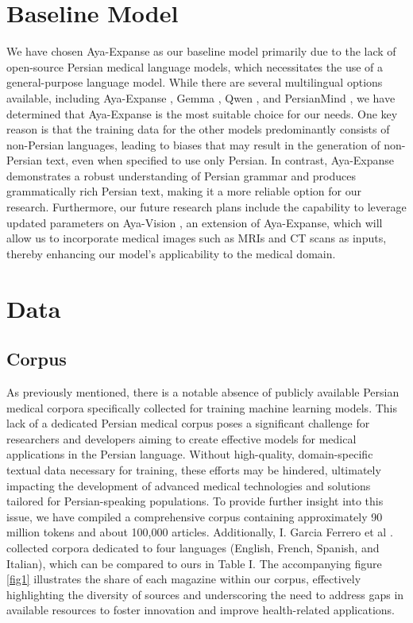 \documentclass[conference]{IEEEtran}
\begin{document}
\section{Baseline Model}
We have chosen Aya-Expanse as our baseline model primarily due to the lack of open-source Persian medical language models, which necessitates the use of a general-purpose language model. While there are several multilingual options available, including Aya-Expanse \cite{b5}, Gemma \cite{b11}, Qwen \cite{b12}, and PersianMind \cite{b12}, we have determined that Aya-Expanse is the most suitable choice for our needs. One key reason is that the training data for the other models predominantly consists of non-Persian languages, leading to biases that may result in the generation of non-Persian text, even when specified to use only Persian. In contrast, Aya-Expanse demonstrates a robust understanding of Persian grammar and produces grammatically rich Persian text, making it a more reliable option for our research. Furthermore, our future research plans include the capability to leverage updated parameters on Aya-Vision
\cite{b12}
, an extension of Aya-Expanse, which will allow us to incorporate medical images such as MRIs and CT scans as inputs, thereby enhancing our model’s applicability to the medical domain.
\section{Data}

\subsection{Corpus}
As previously mentioned, there is a notable absence of publicly available Persian medical corpora specifically collected for training machine learning models. This lack of a dedicated Persian medical corpus poses a significant challenge for researchers and developers aiming to create effective models for medical applications in the Persian language. Without high-quality, domain-specific textual data necessary for training, these efforts may be hindered, ultimately impacting the development of advanced medical technologies and solutions tailored for Persian-speaking populations. To provide further insight into this issue, we have compiled a comprehensive corpus containing approximately 90 million tokens and about 100,000 articles. Additionally, I. Garcia Ferrero et al
\cite{b4}
. collected corpora dedicated to four languages (English, French, Spanish, and Italian), which can be compared to ours in Table I. The accompanying figure \ref{fig1} illustrates the share of each magazine within our corpus, effectively highlighting the diversity of sources and underscoring the need to address gaps in available resources to foster innovation and improve health-related applications.
\end{document}
